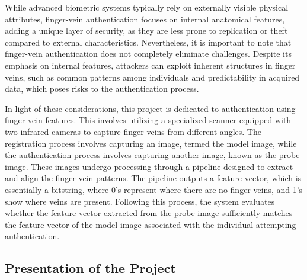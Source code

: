 While advanced biometric systems typically rely on externally visible physical attributes, finger-vein authentication focuses on internal anatomical features, adding a unique layer of security, as they are less prone to replication or theft compared to external characteristics. Nevertheless, it is important to note that finger-vein authentication does not completely eliminate challenges. Despite its emphasis on internal features, attackers can exploit inherent structures in finger veins, such as common patterns among individuals and predictability in acquired data, which poses risks to the authentication process.


In light of these considerations, this project is dedicated to authentication using finger-vein features.
This involves utilizing a specialized scanner equipped with two infrared cameras to capture finger veins from different angles.
The registration process involves capturing an image, termed the model image, while the authentication process involves capturing another image, known as the probe image. These images undergo processing through a pipeline designed to extract and align the finger-vein patterns.
The pipeline outputs a feature vector, which is essentially a bitstring, where 0's represent where there are no finger veins, and 1's show where veins are present.
Following this process, the system evaluates whether the feature vector extracted from the probe image sufficiently matches the feature vector of the model image associated with the individual attempting authentication.



\subsection{Presentation of the Project}

